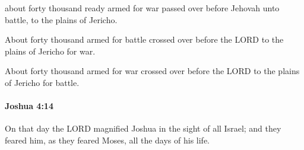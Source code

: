 			\begin{versebox}
					\item[BHS] 
					\item[ASV] about forty thousand ready armed for war passed over before Jehovah unto battle, to the plains of Jericho.
					\item[NIV] About forty thousand armed for battle crossed over before the LORD to the plains of Jericho for war.
					\item[NRSV] About forty thousand armed for war crossed over before the LORD to the plains of Jericho for battle.
			\end{versebox}

		\paragraph{Joshua 4:14} %
			\label{JOSHUA-4-14}

			On that day the LORD magnified Joshua in the sight of all Israel; and they feared him, as they feared Moses, all the days of his life.

